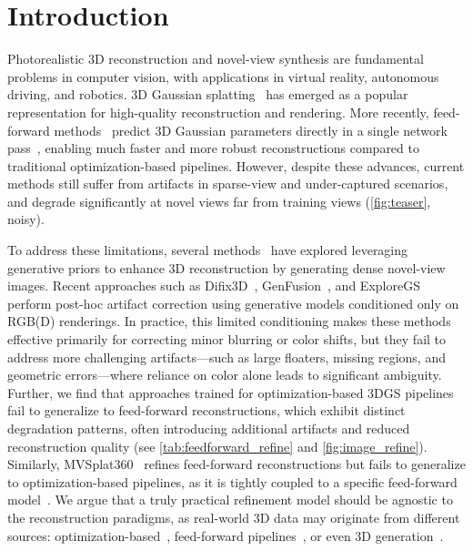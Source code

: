 \section{Introduction}
\label{sec:intro}
Photorealistic 3D reconstruction and novel-view synthesis are fundamental problems in computer vision, with applications in virtual reality, autonomous driving, and robotics. 3D Gaussian splatting~\cite{kerbl3Dgaussians} has emerged as a popular representation for high-quality reconstruction and rendering.
More recently, feed-forward methods~\cite{wang2024dust3r,wang2025vggt,zhang2025flare,keetha2025mapanything} predict 3D Gaussian parameters directly in a single network pass~\cite{smart2024splatt3r,zhang2024gslrm,chen2024mvsplat,charatan2024pixelsplat,chen2024mvsplat360,xu2024depthsplat,jiang2025anysplat,ziwen2025longlrm}, enabling much faster and more robust reconstructions compared to traditional optimization-based pipelines. 
However, despite these advances, current methods still suffer from artifacts in sparse-view and under-captured scenarios, and degrade significantly at novel views far from training views (\cref{fig:teaser}, noisy).

To address these limitations, several methods~\cite{chan2023genvs,wu2023reconfusion,yu2024viewcrafter,liu2024dgsenhancer,liu2024reconx,zhong2025guidevd,teng2025fvgen,ren2025gen3c,wang2025videoscene} have explored leveraging generative priors to enhance 3D reconstruction by generating dense novel-view images. Recent approaches such as Difix3D~\cite{wu2025difix3d}, GenFusion~\cite{Wu2025GenFusion}, and ExploreGS~\cite{Kim_2025_ExploreGS} perform post-hoc artifact correction using generative models conditioned only on RGB(D) renderings. 
In practice, this limited conditioning makes these methods effective primarily for correcting minor blurring or color shifts, but they fail to address more challenging artifacts—such as large floaters, missing regions, and geometric errors—where reliance on color alone leads to significant ambiguity. Further, we find that approaches trained for optimization-based 3DGS pipelines fail to generalize to feed-forward reconstructions, which exhibit distinct degradation patterns, often introducing additional artifacts and reduced reconstruction quality (see \cref{tab:feedforward_refine} and \cref{fig:image_refine}). Similarly, MVSplat360~\cite{chen2024mvsplat360} refines feed-forward reconstructions but fails to generalize to optimization-based pipelines, as it is tightly coupled to a specific feed-forward model~\cite{chen2024mvsplat}. We argue that a truly practical refinement model should be agnostic to the reconstruction paradigms, as real-world 3D data may originate from different sources: optimization-based~\cite{kerbl3Dgaussians,zhu2025_loopsplat}, feed-forward pipelines~\cite{ye2024no,xu2024depthsplat}, or even 3D generation~\cite{szymanowicz2025bolt3d,WorldLabs2025biggerbetter}.

